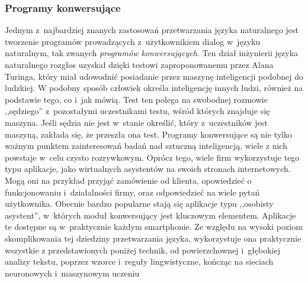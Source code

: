 \documentclass[a4paper, twoside, openright, 12pt]{report}
\begin{document}
            \subsubsection{Programy konwersujące}
                Jednym z~najbardziej znanych zastosowań przetwarzania języka naturalnego jest tworzenie programów
                prowadzących z~użytkownikiem dialog w~języku naturalnym, tak zwanych \emph{programów konwersujących}.
                Ten dział inżynierii języka naturalnego rozgłos uzyskał dzięki testowi zaproponowanemu przez Alana Turinga,
                który miał udowodnić posiadanie przez maszynę inteligencji podobnej do ludzkiej. W podobny sposób człowiek
                określa inteligencję innych ludzi, również na podstawie tego, co i~jak mówią. Test ten polega na swobodnej
                rozmowie ,,sędziego'' z~pozostałymi uczestnikami testu, wśród których znajduje się maszyna. Jeśli sędzia
                nie jest w~stanie określić, który z~uczestników jest maszyną, zakłada się, że przeszła ona test.
                Programy konwersujące są nie tylko ważnym punktem zainteresowań badań nad sztuczną inteligencją, wiele z
                nich powstaje w~celu czysto rozrywkowym. Oprócz tego, wiele firm wykorzystuje tego typu aplikacje,
                jako wirtualnych asystentów na swoich stronach internetowych. Mogą oni na przykład przyjąć zamówienie od
                klienta, opowiedzieć o funkcjonowaniu i~działalności firmy, oraz odpowiedzieć na wiele pytań użytkownika.
                Obecnie bardzo popularne stają się aplikacje typu ,,osobisty asystent'', w~których moduł konwersujący jest
                kluczowym elementem. Aplikacje te dostępne są w~praktycznie każdym smartphonie. Ze względu na wysoki
                poziom skomplikowania tej dziedziny przetwarzania języka, wykorzystuje ona praktycznie wszystkie z
                przedstawionych poniżej technik, od powierzchownej i~głębokiej analizy tekstu, poprzez wzorce i~reguły
                lingwistyczne, kończąc na sieciach neuronowych i~maszynowym uczeniu
\end{document}
